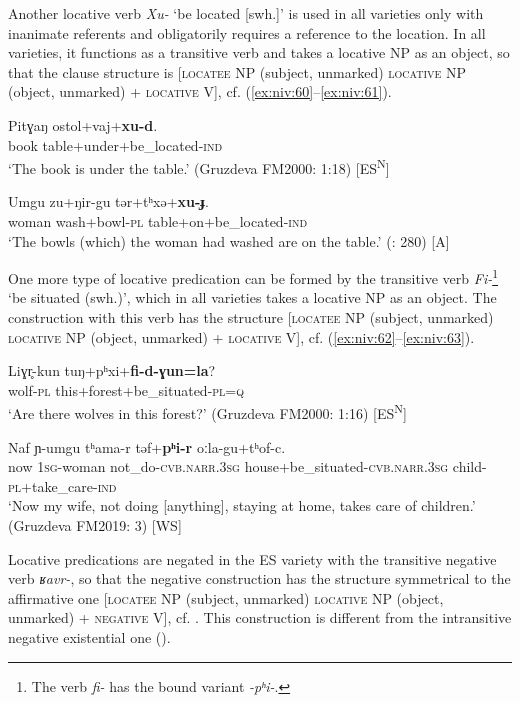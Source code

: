 \documentclass[output=paper,colorlinks,citecolor=brown]{langscibook}
\begin{document}
Another locative verb \textit{Xu-} ‘be located [swh.]’ is used in all varieties only with inanimate referents and obligatorily requires a reference to the location. In all varieties, it functions as a transitive verb and takes a locative NP as an object, so that the clause structure is [\textsc{locatee} NP (subject, unmarked) \textsc{locative} NP (object, unmarked) + \textsc{locative} V], cf. (\ref{ex:niv:60}--\ref{ex:niv:61}).

\ea\label{ex:niv:60}
    \gll Pitɣaŋ ostol+vaj+\textbf{xu-d}. \\ 
         book table+under+be\_located-\textsc{ind} \\
    \glt ‘The book is under the table.’ (Gruzdeva FM2000: 1:18) [ES\textsuperscript{N}]
\z 


\ea\label{ex:niv:61}
    \gll Umgu zu+ŋir-gu tǝr+tʰxǝ+\textbf{xu-ɟ}.\\ 
         woman wash+bowl-\textsc{pl} table+on+be\_located-\textsc{ind} \\
    \glt ‘The bowls (which) the woman had washed are on the table.’ (\citealt{NedjalkovOtaina2013}: 280) [A]
\z 

One more type of locative predication can be formed by the transitive verb \linebreak\textit{Fi-}\footnote{The
    verb \textit{fi-} has the bound variant \textit{-pʰi-}.
} ‘be situated (swh.)’, which in all varieties takes a locative NP as an object. The construction with this verb has the structure [\textsc{locatee} NP (subject, unmarked) \textsc{locative} NP (object, unmarked) + \textsc{locative} V], cf. (\ref{ex:niv:62}--\ref{ex:niv:63}).

\ea\label{ex:niv:62}
    \gll Liɣr̥-kun tuŋ+pʰxi+\textbf{fi-d-ɣun=la}? \\ 
         wolf-\textsc{pl} this+forest+be\_situated{}-\textsc{pl=q} \\
    \glt ‘Are there wolves in this forest?’ (Gruzdeva FM2000: 1:16) [ES\textsuperscript{N}]
\z 

\ea\label{ex:niv:63}
    \gll Naf ɲ{}-umgu tʰama-r təf+\textbf{pʰi-r} o\textbf{ː}la-gu+tʰof-c. \\ 
         now \textsc{1sg-}woman not\_do-\textsc{cvb.narr.3sg} house+be\_situated\textsc{{}-cvb.narr.3sg} child-\textsc{pl}+take\_care-\textsc{ind}\\
    \glt ‘Now my wife, not doing [anything], staying at home, takes care of children.’ (Gruzdeva FM2019: 3) [WS]
\z 

Locative predications are negated in the ES variety with the transitive negative verb \textit{ʁavr-}, so that the negative construction has the structure symmetrical to the affirmative one [\textsc{locatee} NP (subject, unmarked) \textsc{locative} NP (object, unmarked) + \textsc{negative} V], cf. . This construction is different from the intransitive negative existential one ().
\end{document}
